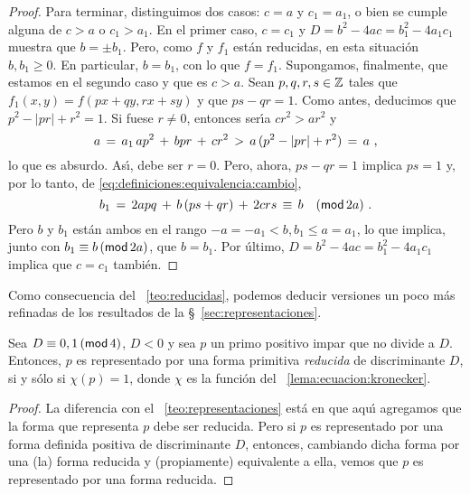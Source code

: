 \begin{proof}
	Para terminar, distinguimos dos casos: $c=a$ y $c_1=a_1$, o bien
	se cumple alguna de $c>a$ o $c_1>a_1$. En el primer caso, $c=c_1$
	y $D=b^2-4ac=b_1^2-4a_1c_1$ muestra que $b=\pm b_1$. Pero, como
	$f$ y $f_1$ est\'an reducidas, en esta situaci\'on $b,b_1\geq 0$.
	En particular, $b=b_1$, con lo que $f=f_1$. Supongamos, finalmente,
	que estamos en el segundo caso y que es $c>a$.
	Sean $p,q,r,s\in\Enteros$ tales que
	\begin{math}
		f_1(x,y)=f(px+qy,rx+sy)
	\end{math}
	y que $ps-qr=1$. Como antes, deducimos que $p^2-|pr|+r^2=1$.
	Si fuese $r\neq 0$, entonces ser\'{\i}a $cr^2>ar^2$ y
	\begin{displaymath}
		a\,=\,a_1\,ap^2\,+\,bpr\,+\,cr^2\,>\,
			a\,(p^2-|pr|+r^2)\,=\,a
		\dispcomma
	\end{displaymath}
	lo que es absurdo. As\'{\i}, debe ser $r=0$. Pero, ahora,
	$ps-qr=1$ implica $ps=1$ y, por lo tanto, de
	\eqref{eq:definiciones:equivalencia:cambio},
	\begin{displaymath}
		b_1\,=\,2apq\,+\,b\,(ps+qr)\,+\,2crs\,\equiv\,b\modulo[2a]
		\dispstop
	\end{displaymath}
	Pero $b$ y $b_1$ est\'an ambos en el rango
	$-a=-a_1<b,b_1\leq a=a_1$, lo que implica, junto con
	$b_1\equiv b\tmodulo[2a]$, que $b=b_1$. Por \'ultimo,
	$D=b^2-4ac=b_1^2-4a_1c_1$ implica que $c=c_1$ tambi\'en.
\end{proof}

Como consecuencia del \teoname~\ref{teo:reducidas},
podemos deducir versiones un poco m\'as refinadas de
los resultados de la \S~\ref{sec:representaciones}.

\begin{teoReducidas}\label{teo:reducidas:representaciones}
	Sea $D\equiv 0,1\tmodulo[4]$, $D<0$ y sea $p$ un primo positivo
	impar que no divide a $D$. Entonces, $p$ es representado por
	una forma primitiva \emph{reducida} de discriminante $D$,
	si y s\'olo si $\chi(p)=1$, donde $\chi$ es la funci\'on
	del \lemaname~\ref{lema:ecuacion:kronecker}.
\end{teoReducidas}

\begin{proof}
	La diferencia con el \teoname~\ref{teo:representaciones}
	est\'a en que aqu\'{\i} agregamos que la forma que representa
	$p$ debe ser reducida. Pero si $p$ es representado por
	una forma definida positiva de discriminante $D$, entonces,
	cambiando dicha forma por una (la) forma reducida y
	(propiamente) equivalente a ella, vemos que $p$ es
	representado por una forma reducida.
\end{proof}

